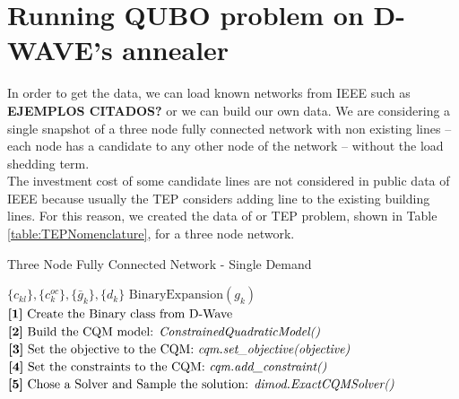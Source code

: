 \section{Running QUBO problem on D-WAVE's annealer}
In order to get the data, we can load known networks from IEEE such as \textbf{EJEMPLOS CITADOS?} or we can build our own data. We are considering a single snapshot of a three node fully connected network with non existing lines -- each node has a candidate to any other node of the network -- without the load shedding term.\\
The investment cost of some candidate lines are not considered in public data of IEEE because usually the TEP considers adding line to the existing building lines. For this reason, we created the data of or TEP problem, shown in Table\,\ref{table:TEPNomenclature}, for a three node network.
\begin{algorithm}
\caption{Three Node Fully Connected Network - Single Demand}\label{alg:threenode}
\begin{algorithmic}
\Require $\{c_{kl}\},\{c_{k}^{oc}\}, \{\bar{g}_{k}\}, \{d_{k}\}$ 
\Ensure $\text{BinaryExpansion}(g_{k})$
\State $\text{\textbf{[1]} Create the Binary class from D-Wave}$
\State $\text{\textbf{[2]} Build the CQM model: \textit{ConstrainedQuadraticModel()}}$
\State $\text{\textbf{[3]} Set the objective to the CQM: \textit{cqm.set\_objective(objective)}}$
\State $\text{\textbf{[4]} Set the constraints to the CQM: \textit{cqm.add\_constraint()}}$
\State $\text{\textbf{[5]} Chose a Solver and Sample the solution: \textit{dimod.ExactCQMSolver()}}$
\end{algorithmic}
\end{algorithm}
